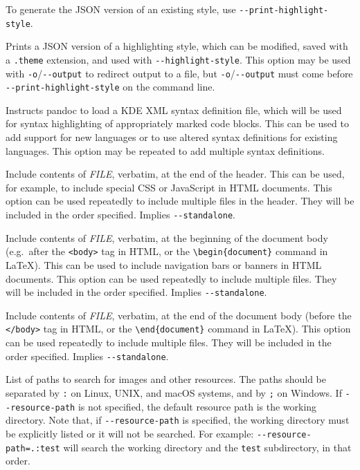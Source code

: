 \documentclass[]{article}
\begin{document}
\begin{description}
To generate the JSON version of an existing style, use
\texttt{-\/-print-highlight-style}.
\item[\texttt{-\/-print-highlight-style=}\emph{STYLE}\textbar{}\emph{FILE}]
Prints a JSON version of a highlighting style, which can be modified,
saved with a \texttt{.theme} extension, and used with
\texttt{-\/-highlight-style}. This option may be used with
\texttt{-o}/\texttt{-\/-output} to redirect output to a file, but
\texttt{-o}/\texttt{-\/-output} must come before
\texttt{-\/-print-highlight-style} on the command line.
\item[\texttt{-\/-syntax-definition=}\emph{FILE}]
Instructs pandoc to load a KDE XML syntax definition file, which will be
used for syntax highlighting of appropriately marked code blocks. This
can be used to add support for new languages or to use altered syntax
definitions for existing languages. This option may be repeated to add
multiple syntax definitions.
\item[\texttt{-H} \emph{FILE},
\texttt{-\/-include-in-header=}\emph{FILE}\textbar{}\emph{URL}]
Include contents of \emph{FILE}, verbatim, at the end of the header.
This can be used, for example, to include special CSS or JavaScript in
HTML documents. This option can be used repeatedly to include multiple
files in the header. They will be included in the order specified.
Implies \texttt{-\/-standalone}.
\item[\texttt{-B} \emph{FILE},
\texttt{-\/-include-before-body=}\emph{FILE}\textbar{}\emph{URL}]
Include contents of \emph{FILE}, verbatim, at the beginning of the
document body (e.g.~after the \texttt{\textless{}body\textgreater{}} tag
in HTML, or the \texttt{\textbackslash{}begin\{document\}} command in
LaTeX). This can be used to include navigation bars or banners in HTML
documents. This option can be used repeatedly to include multiple files.
They will be included in the order specified. Implies
\texttt{-\/-standalone}.
\item[\texttt{-A} \emph{FILE},
\texttt{-\/-include-after-body=}\emph{FILE}\textbar{}\emph{URL}]
Include contents of \emph{FILE}, verbatim, at the end of the document
body (before the \texttt{\textless{}/body\textgreater{}} tag in HTML, or
the \texttt{\textbackslash{}end\{document\}} command in LaTeX). This
option can be used repeatedly to include multiple files. They will be
included in the order specified. Implies \texttt{-\/-standalone}.
\item[\texttt{-\/-resource-path=}\emph{SEARCHPATH}]
List of paths to search for images and other resources. The paths should
be separated by \texttt{:} on Linux, UNIX, and macOS systems, and by
\texttt{;} on Windows. If \texttt{-\/-resource-path} is not specified,
the default resource path is the working directory. Note that, if
\texttt{-\/-resource-path} is specified, the working directory must be
explicitly listed or it will not be searched. For example:
\texttt{-\/-resource-path=.:test} will search the working directory and
the \texttt{test} subdirectory, in that order.


\end{description}
\end{document}
